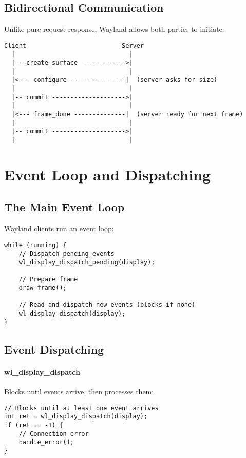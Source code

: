 \subsection{Bidirectional Communication}

Unlike pure request-response, Wayland allows both parties to initiate:

\begin{verbatim}
Client                          Server
  |                               |
  |-- create_surface ------------>|
  |                               |
  |<--- configure ---------------|  (server asks for size)
  |                               |
  |-- commit -------------------->|
  |                               |
  |<--- frame_done --------------|  (server ready for next frame)
  |                               |
  |-- commit -------------------->|
  |                               |
\end{verbatim}

\section{Event Loop and Dispatching}

\subsection{The Main Event Loop}

Wayland clients run an event loop:

\begin{lstlisting}[style=cstyle, caption=Basic Event Loop]
while (running) {
    // Dispatch pending events
    wl_display_dispatch_pending(display);

    // Prepare frame
    draw_frame();

    // Read and dispatch new events (blocks if none)
    wl_display_dispatch(display);
}
\end{lstlisting}

\subsection{Event Dispatching}

\paragraph{wl\_display\_dispatch}
Blocks until events arrive, then processes them:
\begin{lstlisting}[style=cstyle]
// Blocks until at least one event arrives
int ret = wl_display_dispatch(display);
if (ret == -1) {
    // Connection error
    handle_error();
}
\end{lstlisting}

